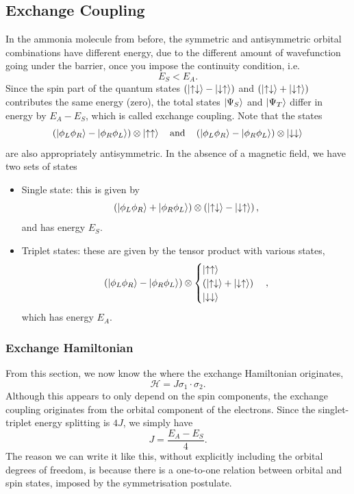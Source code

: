 \documentclass{article}
\begin{document}
\subsection{Exchange Coupling}
In the ammonia molecule from before, the symmetric and antisymmetric orbital combinations have different energy, due to the different amount of wavefunction going under the barrier, once you impose the continuity condition, i.e. 
\[
    E_S<E_A.
\]
Since the spin part of the quantum states $\left( \ket{\uparrow \downarrow}-\ket{\downarrow \uparrow} \right)$ and $\left( \ket{\uparrow \downarrow}+\ket{\downarrow \uparrow} \right)$ contributes the same energy (zero), the total states $\ket{\Psi _S}$ and $\ket{\Psi _T}$ differ in energy by $E_A-E_S$, which is called exchange coupling. Note that the states 
\[
    \left( \ket{\phi _L\phi _R}-\ket{\phi _R\phi _L} \right)\otimes \ket{\uparrow \uparrow}\quad \text{and}\quad \left( \ket{\phi _L\phi _R}-\ket{\phi _R\phi _L} \right)\otimes \ket{\downarrow \downarrow}
\]
are also appropriately antisymmetric. In the absence of a magnetic field, we have two sets of states
\begin{itemize}
    \item Single state: this is given by 
    \[
        \left( \ket{\phi _L\phi _R}+\ket{\phi _R\phi _L} \right)\otimes \left( \ket{\uparrow \downarrow}-\ket{\downarrow \uparrow} \right),
    \]
    and has energy $E_S$.
\item Triplet states: these are given by the tensor product with various states,
\[
    \left( \ket{\phi _L\phi _R}-\ket{\phi _R\phi _L} \right)\otimes \begin{cases}
        \ket{\uparrow \uparrow}\\
        \left( \ket{\uparrow \downarrow}+\ket{\downarrow \uparrow} \right)\\
        \ket{\downarrow \downarrow}
    \end{cases},
\]
which has energy $E_A$.
\end{itemize}

\subsubsection{Exchange Hamiltonian}
From this section, we now know the where the exchange Hamiltonian originates,
\[
    \mathcal{H}=J\sigma _1\cdot\sigma _2.
\]
Although this appears to only depend on the spin components, the exchange coupling originates from the orbital component of the electrons. Since the singlet-triplet energy splitting is $4J$, we simply have 
\[
    J=\frac{E_A-E_S}{4}.
\]
The reason we can write it like this, without explicitly including the orbital degrees of freedom, is because there is a one-to-one relation between orbital and spin states, imposed by the symmetrisation postulate.
\end{document}
